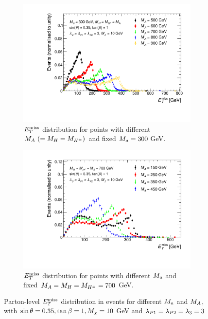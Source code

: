\begin{figure}%
	\centering

	\begin{subfigure}[t]{0.48\textwidth}
	\centering
	\includegraphics[width=\textwidth]{texinputs/04_grid/figures/monoHbb_m_large_A_scan_MET_liny_norm2one.pdf}
	\caption{$E_T^\mathrm{miss}$ distribution for points with different $M_{A}~(=M_{H}=M_{H^{\pm}})$
    and fixed $M_{a} = 300$ GeV. 
	\label{fig:monoHbb_mA_scan_met}} 
    \end{subfigure}
    \begin{subfigure}[t]{0.48\textwidth}
	\centering
	\includegraphics[width=\textwidth]{texinputs/04_grid/figures/monoHbb_m_small_a_scan_MET_liny_norm2one.pdf}	
	\caption{$E_T^\mathrm{miss}$ distribution for points with different $M_{a}$ and fixed $ M_{A}=M_{H}=M_{H^{\pm}}= 700$ GeV. 
	\label{fig:monoHbb_ma_scan_met}}
    \end{subfigure}
    
    \caption{Parton-level $E_T^\mathrm{miss}$ distribution in \monohbb events for different $M_{a}$ and $M_{A}$, with $ \sin\theta = 0.35, \tan\beta = 1, M_{\chi} = 10$ GeV and $ \lambda_{P1} = \lambda_{P2} = \lambda_{3} = 3 $}
\end{figure}

